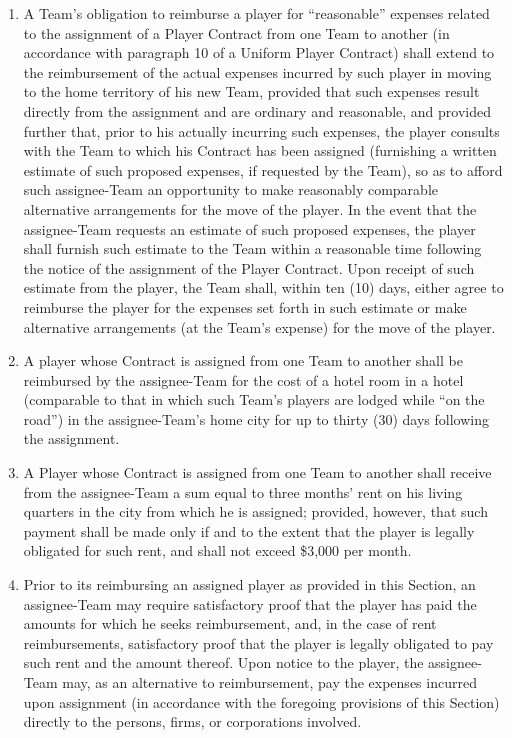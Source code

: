 \documentclass[
]{book}
\providecommand{\tightlist}{%
  \setlength{\itemsep}{0pt}\setlength{\parskip}{0pt}}
\begin{document}
\begin{enumerate}
\def\labelenumi{(\alph{enumi})}
\tightlist
\item
  A Team's obligation to reimburse a player for ``reasonable'' expenses related to the assignment of a Player Contract from one Team to another (in accordance with paragraph 10 of a Uniform Player Contract) shall extend to the reimbursement of the actual expenses incurred by such player in moving to the home territory of his new Team, provided that such expenses result directly from the assignment and are ordinary and reasonable, and provided further that, prior to his actually incurring such expenses, the player consults with the Team to which his Contract has been assigned (furnishing a written estimate of such proposed expenses, if requested by the Team), so as to afford such assignee-Team an opportunity to make reasonably comparable alternative arrangements for the move of the player. In the event that the assignee-Team requests an estimate of such proposed expenses, the player shall furnish such estimate to the Team within a reasonable time following the notice of the assignment of the Player Contract. Upon receipt of such estimate from the player, the Team shall, within ten (10) days, either agree to reimburse the player for the expenses set forth in such estimate or make alternative arrangements (at the Team's expense) for the move of the player.
\item
  A player whose Contract is assigned from one Team to another shall be reimbursed by the assignee-Team for the cost of a hotel room in a hotel (comparable to that in which such Team's players are lodged while ``on the road'') in the assignee-Team's home city for up to thirty (30) days following the assignment.
\item
  A Player whose Contract is assigned from one Team to another shall receive from the assignee-Team a sum equal to three months' rent on his living quarters in the city from which he is assigned; provided, however, that such payment shall be made only if and to the extent that the player is legally obligated for such rent, and
  shall not exceed \$3,000 per month.
\item
  Prior to its reimbursing an assigned player as provided in this Section, an assignee-Team may require satisfactory proof that the player has paid the amounts for which he seeks reimbursement, and, in the case of rent reimbursements, satisfactory proof that the player is legally obligated to pay such rent and the amount thereof. Upon notice to the player, the assignee-Team may, as an alternative to reimbursement, pay the expenses incurred upon assignment (in accordance with the foregoing provisions of this Section) directly to the persons, firms, or corporations involved.

\end{enumerate}
\end{document}
